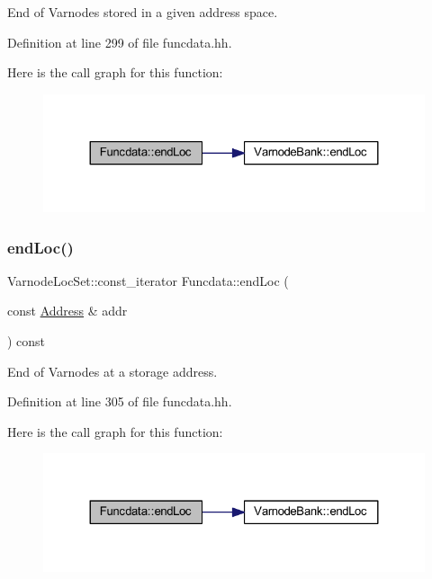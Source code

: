 End of Varnodes stored in a given address space. 



Definition at line 299 of file funcdata.\+hh.

Here is the call graph for this function\+:
\nopagebreak
\begin{figure}[H]
\begin{center}
\leavevmode
\includegraphics[width=324pt]{class_funcdata_a23bcf948b0b6306696e595b2464c746b_cgraph}
\end{center}
\end{figure}
\mbox{\label{class_funcdata_a4417d6ddefad162550e3abdbe8424d76}} 
\subsubsection{\texorpdfstring{endLoc()}{endLoc()}\hspace{0.1cm}{\footnotesize\ttfamily [3/6]}}
{\footnotesize\ttfamily Varnode\+Loc\+Set\+::const\+\_\+iterator Funcdata\+::end\+Loc (\begin{DoxyParamCaption}\item[{const \mbox{\hyperlink{class_address}{Address}} \&}]{addr }\end{DoxyParamCaption}) const\hspace{0.3cm}{\ttfamily [inline]}}



End of Varnodes at a storage address. 



Definition at line 305 of file funcdata.\+hh.

Here is the call graph for this function\+:
\nopagebreak
\begin{figure}[H]
\begin{center}
\leavevmode
\includegraphics[width=324pt]{class_funcdata_a4417d6ddefad162550e3abdbe8424d76_cgraph}
\end{center}
\end{figure}
\mbox{\label{class_funcdata_ac026cfb35c8a407c50d21837510d78f7}} 
